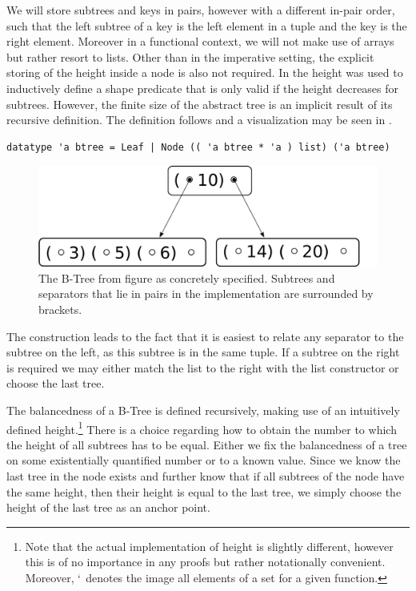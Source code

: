 We will store subtrees and keys in pairs,
however with a different in-pair order,
such that the left subtree of a key is the left element
in a tuple and the key is the right element.
Moreover in a functional context, we will not make use of arrays
but rather resort to lists.
Other than in the imperative setting,
the explicit storing of the height inside a node is also
not required.
In \parencite{DBLP:conf/popl/MalechaMSW10} the height was
used to inductively define a shape predicate that is only valid
if the height decreases for subtrees.
However, the finite size of the abstract tree is an implicit
result of its recursive definition.
The definition follows and a visualization may be seen in .

\begin{lstlisting}[mathescape=true, language=Isabelle,label=lst:btree-def]
datatype 'a btree = Leaf | Node (( 'a btree * 'a ) list) ('a btree)
\end{lstlisting}

\begin{figure}
    \centering
    \includegraphics[width=0.5\linewidth]{figures/btree-basic.pdf}
    \caption[Visualization of the implementation choice for B-Trees]
    {The B-Tree from figure  as concretely specified.
    Subtrees and separators that lie in pairs in the implementation are surrounded by brackets.}
    \label{fig:btree-basic}
\end{figure}


The construction leads to the fact that it is easiest to relate any separator
to the subtree on the left, as this subtree is in the same tuple.
If a subtree on the right is required we may either match the
list to the right with the list constructor or 
choose the last tree.

The balancedness of a B-Tree is defined recursively, making use
of an intuitively defined height.\footnote{
    Note that the actual implementation of height is slightly different,
    however this is of no importance in any proofs but rather notationally convenient.
    Moreover, $`$ denotes the image all elements of a set for a given function.
}
There is a choice regarding how to obtain
the number to which the height of all subtrees has to be equal.
Either we fix the balancedness of a tree
on some existentially quantified number or to a known value.
Since we know the last tree in the node exists and further
know that if all subtrees of the node have the same height,
then their height is equal to the last tree,
we simply choose the height of the last tree as an anchor point.

